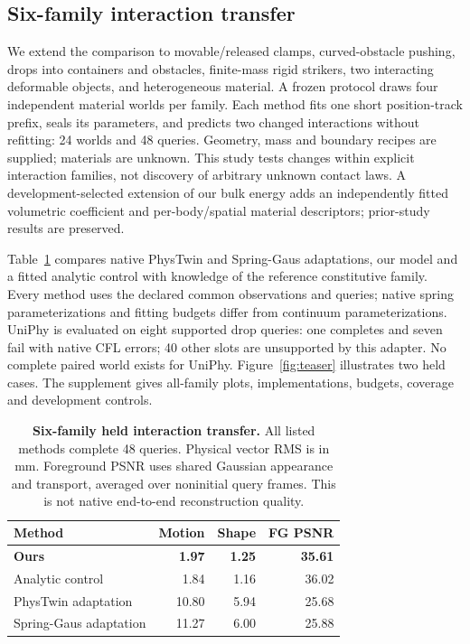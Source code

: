 \subsection{Six-family interaction transfer}
We extend the comparison to movable/released clamps, curved-obstacle
pushing, drops into containers and obstacles, finite-mass rigid strikers,
two interacting deformable objects, and heterogeneous material. A frozen
protocol draws four independent material worlds per family. Each method
fits one short position-track prefix, seals its parameters, and predicts
two changed interactions without refitting: 24 worlds and 48 queries.
Geometry, mass and boundary recipes are supplied; materials are unknown.
This study tests changes within explicit interaction families, not discovery
of arbitrary unknown contact laws. A development-selected extension of our
bulk energy adds an independently fitted volumetric coefficient and
per-body/spatial material descriptors; prior-study results are preserved.

Table~\ref{tab:complex-main} compares native PhysTwin and Spring-Gaus
adaptations, our model and a fitted analytic control with knowledge of the
reference constitutive family. Every method uses the declared common
observations and queries; native spring parameterizations and fitting
budgets differ from continuum parameterizations. UniPhy is evaluated on
eight supported drop queries: one completes and seven fail with native CFL
errors; 40 other slots are unsupported by this adapter. No complete
paired world exists for UniPhy. Figure~\ref{fig:teaser} illustrates two held cases. The supplement gives all-family plots, implementations,
budgets, coverage and development controls.

\begin{table}[t]
\centering\small\setlength{\tabcolsep}{4pt}
\caption{\textbf{Six-family held interaction transfer.} All listed methods
complete 48 queries. Physical vector RMS is in mm. Foreground PSNR uses
shared Gaussian appearance and transport, averaged over noninitial query
frames. This is not native end-to-end reconstruction quality.}
\label{tab:complex-main}
\begin{tabular}{lrrr}
\toprule Method & Motion & Shape & FG PSNR \\
\midrule
\textcolor{oursteal}{\textbf{Ours}} & \textbf{1.97} & \textbf{1.25} & \textbf{35.61} \\
Analytic control & 1.84 & 1.16 & 36.02 \\
PhysTwin adaptation & 10.80 & 5.94 & 25.68 \\
Spring-Gaus adaptation & 11.27 & 6.00 & 25.88 \\
\bottomrule
\end{tabular}
\end{table}

